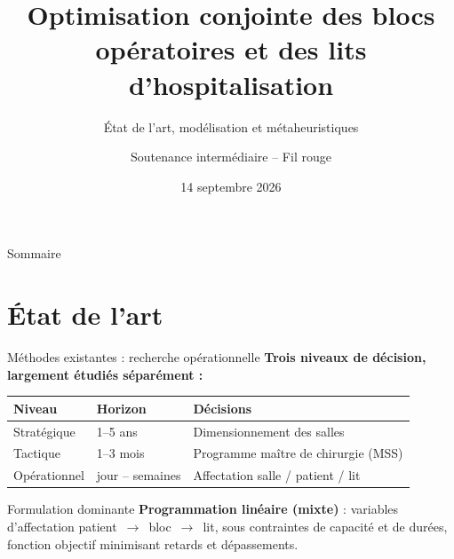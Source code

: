 \documentclass[aspectratio=169,11pt]{beamer}
\title[Optimisation blocs \& lits]{Optimisation conjointe des blocs opératoires et des lits d'hospitalisation}
\subtitle{État de l'art, modélisation et métaheuristiques}
\author{Soutenance intermédiaire -- Fil rouge}
\institute{Projet Altao}
\date{14 septembre 2026}
\begin{document}
\begin{frame}
  \titlepage
\end{frame}

\begin{frame}{Sommaire}
  \tableofcontents
\end{frame}

\section{État de l'art}

\begin{frame}{Méthodes existantes : recherche opérationnelle}
  \textbf{Trois niveaux de décision, largement étudiés séparément :}
  \vspace{0.3em}
  \begin{table}
    \centering\small
    \begin{tabular}{lll}
      \toprule
      \textbf{Niveau} & \textbf{Horizon} & \textbf{Décisions} \\
      \midrule
      Stratégique & 1--5 ans & Dimensionnement des salles \\
      Tactique & 1--3 mois & Programme maître de chirurgie (MSS) \\
      Opérationnel & jour -- semaines & Affectation salle / patient / lit \\
      \bottomrule
    \end{tabular}
  \end{table}
  \begin{block}{Formulation dominante}
    \textbf{Programmation linéaire (mixte)} : variables d'affectation
    patient~$\rightarrow$~bloc~$\rightarrow$~lit, sous contraintes de capacité
    et de durées, fonction objectif minimisant retards et dépassements.
  \end{block}
\end{frame}
\end{document}
